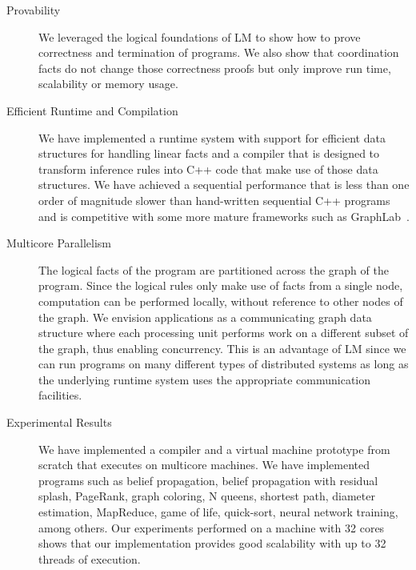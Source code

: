 \begin{description}
   \item[Provability]
   
   We leveraged the logical foundations of LM to show how to prove correctness
   and termination of programs. We also show that coordination facts do not
   change those correctness proofs but only improve run time, scalability or
   memory usage.

\item[Efficient Runtime and Compilation]

   We have implemented a runtime system with support for efficient data
   structures for handling linear facts and a compiler that is designed to
   transform inference rules into C++ code that make use of those data
   structures. We have achieved a sequential performance that is less than one
   order of magnitude slower than hand-written sequential C++ programs and is
   competitive with some more mature frameworks such as
   GraphLab~\cite{GraphLab2010}.

\item[Multicore Parallelism]
   
   The logical facts of the program are partitioned across the graph of the
   program. Since the logical rules only make use of facts from a single node,
   computation can be performed locally, without reference to other nodes of the
   graph. We envision applications as a communicating graph data structure where
   each processing unit performs work on a different subset of the graph, thus
   enabling concurrency. This is an advantage of LM since we can run programs on
   many different types of distributed systems as long as the underlying runtime
   system uses the appropriate communication facilities.

\item[Experimental Results]

   We have implemented a compiler and a virtual machine prototype from scratch
   that executes on multicore machines.  We have implemented programs such as
   belief propagation, belief propagation with residual splash, PageRank, graph
   coloring, N queens, shortest path, diameter estimation, MapReduce, game of
   life, quick-sort, neural network training, among others. Our experiments
   performed on a machine with 32 cores shows that our implementation provides
   good scalability with up to 32 threads of execution.
   
\end{description}
